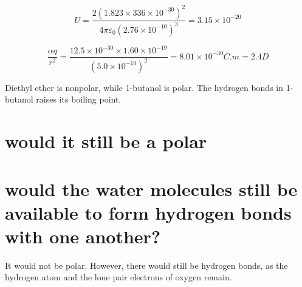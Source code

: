 \documentclass[answers]{exam}
\begin{document}
\begin{questions}

\begin{solution}
	$$U = \frac{2\left(1.823\times336\times10^{-30}\right)^2}{4\pi\varepsilon_0\left(2.76\times10^{-10}\right)^3} = 3.15\times10^{-20}$$
\end{solution}


\begin{solution}
	$$\frac{\alpha q}{r^2} = \frac{12.5\times10^{-30}\times1.60\times10^{-19}}{\left(5.0\times10^{-10}\right)^2} = 8.01\times10^{-30}\si{C.m} = 2.4\si{D}$$
\end{solution}


\begin{solution}
	Diethyl ether is nonpolar, while 1-butanol is polar. The hydrogen bonds in 1-butanol raises its boiling point.
\end{solution}


\begin{parts}
	\part{would it still be a polar}
	\part{would the water molecules still be available to form hydrogen bonds with one another?}
\end{parts}

\begin{solution}
	It would not be polar. However, there would still be hydrogen bonds, as the hydrogen atom and the lone pair electrons of oxygen remain.
\end{solution}


\end{questions}
\end{document}
